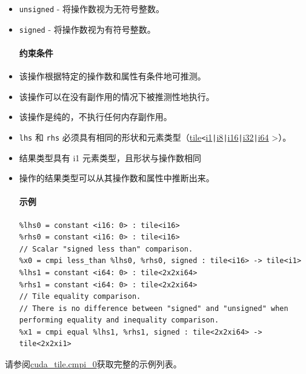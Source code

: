 \documentclass{article}
\begin{document}
\begin{itemize}
\item \texttt{unsigned} - 将操作数视为无符号整数。
\item \texttt{signed} - 将操作数视为有符号整数。


\paragraph{约束条件}

\item 该操作根据特定的操作数和属性有条件地可推测。
\item 该操作可以在没有副作用的情况下被推测性地执行。
\item 该操作是纯的，不执行任何内存副作用。
\item \texttt{lhs} 和 \texttt{rhs} 必须具有相同的形状和元素类型（\href{https://docs.nvidia.com/cuda/tile-ir/latest/sections/types.html#type-tile}{tile}\texttt{<}\href{https://docs.nvidia.com/cuda/tile-ir/latest/sections/types.html#subsection-element-types}{i1}\texttt{|}\href{https://docs.nvidia.com/cuda/tile-ir/latest/sections/types.html#subsection-element-types}{i8}\texttt{|}\href{https://docs.nvidia.com/cuda/tile-ir/latest/sections/types.html#subsection-element-types}{i16}\texttt{|}\href{https://docs.nvidia.com/cuda/tile-ir/latest/sections/types.html#subsection-element-types}{i32}\texttt{|}\href{https://docs.nvidia.com/cuda/tile-ir/latest/sections/types.html#subsection-element-types}{i64} >）。
\item 结果类型具有 i1 元素类型，且形状与操作数相同
\item 操作的结果类型可以从其操作数和属性中推断出来。


\paragraph{示例}

\begin{lstlisting}
%lhs0 = constant <i16: 0> : tile<i16>
%rhs0 = constant <i16: 0> : tile<i16>
// Scalar "signed less than" comparison.
%x0 = cmpi less_than %lhs0, %rhs0, signed : tile<i16> -> tile<i1>
%lhs1 = constant <i64: 0> : tile<2x2xi64>
%rhs1 = constant <i64: 0> : tile<2x2xi64>
// Tile equality comparison.
// There is no difference between "signed" and "unsigned" when performing equality and inequality comparison.
%x1 = cmpi equal %lhs1, %rhs1, signed : tile<2x2xi64> -> tile<2x2xi1>
\end{lstlisting}

\end{itemize}
请参阅\href{https://docs.nvidia.com/cuda/tile-ir/latest/sections/appendix.html#example-cuda-tile-cmpi-0}{cuda\_tile.cmpi\_0}获取完整的示例列表。
\end{document}
